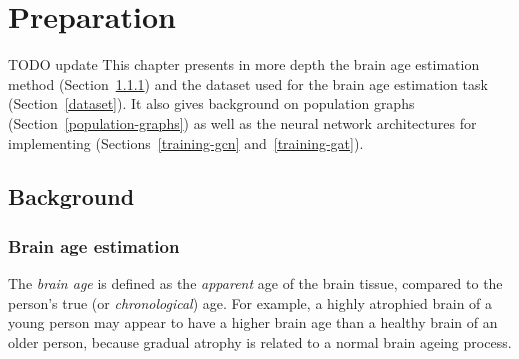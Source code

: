 \chapter{Preparation}


TODO update
This chapter presents in more depth the brain age estimation method (Section~\ref{brain-age-estimation}) and the dataset used for the brain age estimation task (Section~\ref{dataset}). It also gives background on population graphs (Section~\ref{population-graphs}) as well as the neural network architectures for implementing (Sections~\ref{training-gcn} and~\ref{training-gat}).

\section{Background}
\subsection{Brain age estimation}
\label{brain-age-estimation}

The \textit{brain age} is defined as the \textit{apparent} age of the brain tissue, compared to the person's true (or \textit{chronological}) age. For example, a highly atrophied brain of a young person may appear to have a higher brain age than a healthy brain of an older person, because gradual atrophy is related to a normal brain ageing process. 

